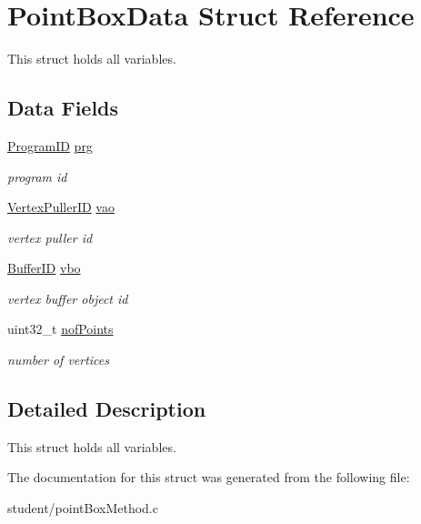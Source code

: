 \hypertarget{structPointBoxData}{}\section{Point\+Box\+Data Struct Reference}
\label{structPointBoxData}


This struct holds all variables.  


\subsection*{Data Fields}
\begin{DoxyCompactItemize}
\item 
\mbox{\label{structPointBoxData_acec81e47d56286a7994aef662694fc42}} 
\hyperlink{student_2fwd_8h_a15e62786033208aec9487a51e808f81d}{Program\+ID} \hyperlink{structPointBoxData_acec81e47d56286a7994aef662694fc42}{prg}
\begin{DoxyCompactList}\small\item\em program id \end{DoxyCompactList}\item 
\mbox{\label{structPointBoxData_a9eed6fe44cf77b8c7e98a88d25eb2211}} 
\hyperlink{student_2fwd_8h_a23828e2281a794e193ebaf0df3e1f17c}{Vertex\+Puller\+ID} \hyperlink{structPointBoxData_a9eed6fe44cf77b8c7e98a88d25eb2211}{vao}
\begin{DoxyCompactList}\small\item\em vertex puller id \end{DoxyCompactList}\item 
\mbox{\label{structPointBoxData_a65fa14357d247945143d10d5a60cde3e}} 
\hyperlink{student_2fwd_8h_a60a12bf4868ebe47cc571ce96a03f99c}{Buffer\+ID} \hyperlink{structPointBoxData_a65fa14357d247945143d10d5a60cde3e}{vbo}
\begin{DoxyCompactList}\small\item\em vertex buffer object id \end{DoxyCompactList}\item 
\mbox{\label{structPointBoxData_acca7bde471ab3396be16f21efda7c639}} 
uint32\+\_\+t \hyperlink{structPointBoxData_acca7bde471ab3396be16f21efda7c639}{nof\+Points}
\begin{DoxyCompactList}\small\item\em number of vertices \end{DoxyCompactList}\end{DoxyCompactItemize}


\subsection{Detailed Description}
This struct holds all variables. 

The documentation for this struct was generated from the following file\+:\begin{DoxyCompactItemize}
\item 
student/point\+Box\+Method.\+c\end{DoxyCompactItemize}
